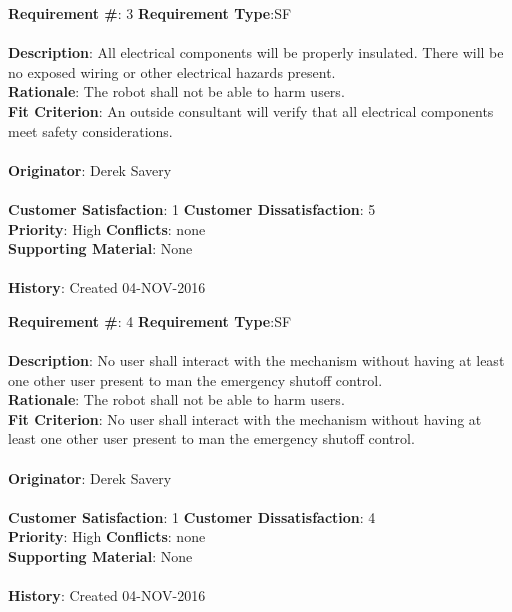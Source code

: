 \documentclass[titlepage]{article}
\begin{document}
\begin{framed}
	\noindent\textbf{Requirement \#}: 3 \hfill \textbf{Requirement Type}:SF \hfill\\\\
	\noindent\textbf{Description}: All electrical components will be properly insulated. There will be no exposed wiring or other electrical hazards present. \\
	\textbf{Rationale}: The robot shall not be able to harm users.\\
	\textbf{Fit Criterion}: An outside consultant will verify that all electrical components meet safety considerations.\\\\
	\textbf{Originator}: Derek Savery\\\\
	\noindent\textbf{Customer Satisfaction}: 1 \hfill 	\textbf{Customer Dissatisfaction}: 5 \hfill\\
	\textbf{Priority}: High \hfill \textbf{Conflicts}: none \hfill\\
	\textbf{Supporting Material}: None\\\\
	\noindent\textbf{History}: Created 04-NOV-2016
\end{framed}


\begin{framed}
	\noindent\textbf{Requirement \#}: 4 \hfill \textbf{Requirement Type}:SF \hfill\\\\
	\noindent\textbf{Description}: No user shall interact with the mechanism without having at least one other user present to man the emergency shutoff control. \\
	\textbf{Rationale}: The robot shall not be able to harm users.\\
	\textbf{Fit Criterion}: No user shall interact with the mechanism without having at least one other user present to man the emergency shutoff control.\\\\
	\textbf{Originator}: Derek Savery\\\\
	\noindent\textbf{Customer Satisfaction}: 1 \hfill 	\textbf{Customer Dissatisfaction}: 4 \hfill\\
	\textbf{Priority}: High \hfill \textbf{Conflicts}: none \hfill\\
	\textbf{Supporting Material}: None\\\\
	\noindent\textbf{History}: Created 04-NOV-2016
\end{framed}
\end{document}
